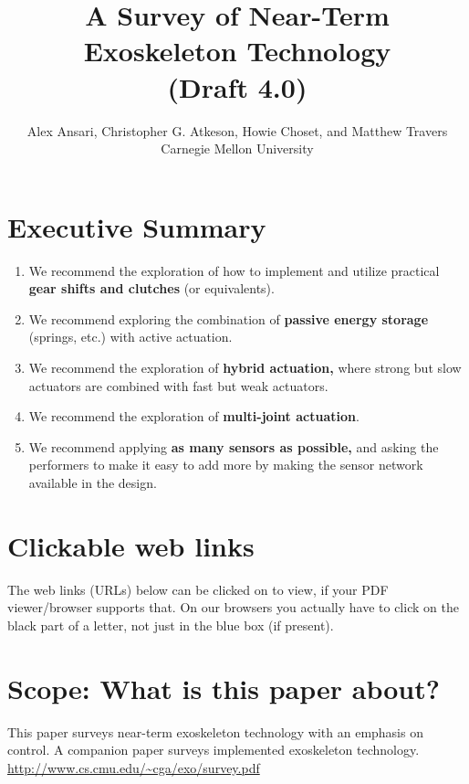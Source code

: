\documentclass[letterpaper,12pt,fullpage]{article}
\begin{document}
\title{A Survey of Near-Term Exoskeleton Technology\\
(Draft 4.0)}

\author{Alex Ansari, Christopher G. Atkeson, Howie Choset, and Matthew Travers\\
Carnegie Mellon University}

\maketitle

\section{Executive Summary}

\begin{enumerate}
\item
We recommend the exploration of how to implement and utilize practical
{\bf gear shifts and clutches} (or equivalents).
\item
We recommend exploring the combination of {\bf passive energy storage}
(springs, etc.) with active actuation.
\item
We recommend the exploration of {\bf hybrid actuation,} where strong but 
slow actuators are combined with fast but weak actuators.
\item
We recommend the exploration of {\bf multi-joint actuation}.
\item
We recommend applying {\bf as many sensors as possible,} and asking the performers
to make it easy to add more by making the sensor network available in the design.
\end{enumerate}

\section{Clickable web links}

The web links (URLs) below can be clicked on to view, if your PDF viewer/browser supports that. On our browsers you actually have to click on the black
part of a letter, not just in the blue box (if present).

\section{Scope: What is this paper about?}

This paper surveys near-term exoskeleton technology with an
emphasis on control.
A companion paper surveys implemented exoskeleton technology.\\
\url{http://www.cs.cmu.edu/~cga/exo/survey.pdf}
\end{document}
